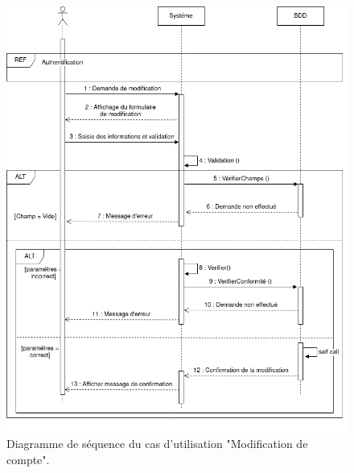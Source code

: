 \documentclass[french]{report}
\begin{document}
        \begin{figure}[H]
            \centering
            \includegraphics[width=1\textwidth]{images/Seq Diag Modification de compte.drawio.png}
            \caption{Diagramme de séquence du cas d'utilisation "Modification de compte".}
            \label{Seq Diag Modification compte}
        \end{figure}
        
        
\end{document}
